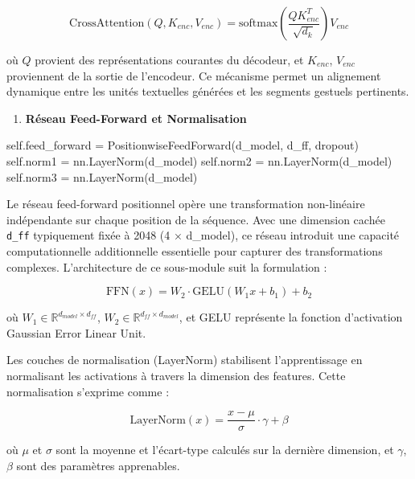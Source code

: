\documentclass[12pt]{article}
\providecommand{\tightlist}{%
      \setlength{\itemsep}{0pt}\setlength{\parskip}{0pt}}
\newenvironment{Shaded}{}{}
\newcommand{\NormalTok}[1]{{#1}}
\newcommand{\VariableTok}[1]{\textcolor[rgb]{0.10,0.09,0.49}{{#1}}}
\newcommand{\OperatorTok}[1]{\textcolor[rgb]{0.40,0.40,0.40}{{#1}}}
\begin{document}
\[
\text{CrossAttention}(Q, K_{enc}, V_{enc}) = \text{softmax}\left(\frac{QK_{enc}^T}{\sqrt{d_k}}\right)V_{enc}
\]

où \(Q\) provient des représentations courantes du décodeur, et
\(K_{enc}\), \(V_{enc}\) proviennent de la sortie de l'encodeur. Ce
mécanisme permet un alignement dynamique entre les unités textuelles
générées et les segments gestuels pertinents.

\begin{enumerate}
\def\labelenumi{\arabic{enumi}.}
\setcounter{enumi}{2}
\tightlist
\item
  \textbf{Réseau Feed-Forward et Normalisation}
\end{enumerate}

\begin{Shaded}
\begin{Highlighting}[]
\VariableTok{self}\NormalTok{.feed\_forward }\OperatorTok{=}\NormalTok{ PositionwiseFeedForward(d\_model, d\_ff, dropout)}
\VariableTok{self}\NormalTok{.norm1 }\OperatorTok{=}\NormalTok{ nn.LayerNorm(d\_model)}
\VariableTok{self}\NormalTok{.norm2 }\OperatorTok{=}\NormalTok{ nn.LayerNorm(d\_model)  }
\VariableTok{self}\NormalTok{.norm3 }\OperatorTok{=}\NormalTok{ nn.LayerNorm(d\_model)}
\end{Highlighting}
\end{Shaded}

Le réseau feed-forward positionnel opère une transformation non-linéaire
indépendante sur chaque position de la séquence. Avec une dimension
cachée \texttt{d\_ff} typiquement fixée à 2048 (4 × d\_model), ce réseau
introduit une capacité computationnelle additionnelle essentielle pour
capturer des transformations complexes. L'architecture de ce sous-module
suit la formulation :

\[
\text{FFN}(x) = W_2 \cdot \text{GELU}(W_1 x + b_1) + b_2
\]

où \(W_1 \in \mathbb{R}^{d_{model} \times d_{ff}}\),
\(W_2 \in \mathbb{R}^{d_{ff} \times d_{model}}\), et GELU représente la
fonction d'activation Gaussian Error Linear Unit.

Les couches de normalisation (LayerNorm) stabilisent l'apprentissage en
normalisant les activations à travers la dimension des features. Cette
normalisation s'exprime comme :

\[
\text{LayerNorm}(x) = \frac{x - \mu}{\sigma} \cdot \gamma + \beta
\]

où \(\mu\) et \(\sigma\) sont la moyenne et l'écart-type calculés sur la
dernière dimension, et \(\gamma\), \(\beta\) sont des paramètres
apprenables.
\end{document}
